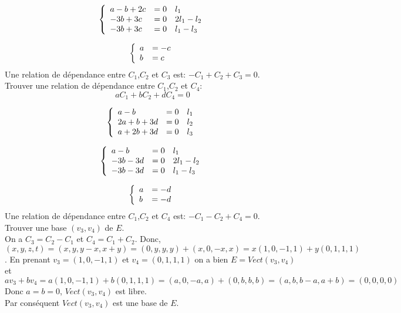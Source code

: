 \documentclass[]{book}
\theoremstyle{definition}
\begin{document}
$$
\left\{ 
\begin{array}{l l l}
a - b + 2c & = 0 & l_1 \\
    -3b + 3c & = 0 & 2l_1-l_2 \\
    -3b + 3c & = 0 & l_1 - l_3 \\
\end{array}
\right. 
$$

$$
\left\{ 
\begin{array}{l l}
a & = -c \\
b & = c \\
\end{array}
\right. 
$$
Une relation de d\'ependance entre $C_1$,$C_2$ et $C_3$ est: $-C_1 + C_2 + C_3 = 0$.\\


Trouver une relation de d\'ependance entre $C_1$,$C_2$ et $C_4$:\\
$$aC_1+bC_2+dC_4 = 0$$

$$
\left\{ 
\begin{array}{l l l}
a - b  & = 0 & l_1\\
2a + b + 3d & = 0 & l_2 \\
a +   2b + 3d & = 0 & l_3 \\
\end{array}
\right. 
$$

$$
\left\{ 
\begin{array}{l l l}
a - b  & = 0 & l_1\\
    -3b - 3d & = 0 & 2l_1 - l_2\\
    -3b - 3d & = 0 & l_1 - l_3\\
\end{array}
\right. 
$$

$$
\left\{ 
\begin{array}{l l}
a & = -d \\
b & = -d \\
\end{array}
\right. 
$$
Une relation de d\'ependance entre $C_1$,$C_2$ et $C_4$ est: $-C_1 - C_2 + C_4 = 0$.\\


Trouver une base $(v_3, v_4)$ de $E$.\\
On a $C_3=C_2-C_1$ et $C_4=C_1+C_2$. Donc, $(x,y,z,t) = (x,y,y-x,x+y) = (0,y,y,y) + (x,0,-x,x) = x(1,0,-1,1) + y(0,1,1,1)$. En prenant $v_3 = (1,0,-1,1)$ et $v_4 = (0,1,1,1)$ on a bien $E = Vect(v_3,v_4)$ et 
$$av_3 + bv_4 = a(1,0,-1,1) + b(0,1,1,1) = (a,0,-a,a)+(0,b,b,b) = (a,b,b-a,a+b) = (0,0,0,0)$$
Donc $a=b=0$, $Vect(v_3,v_4)$ est libre.\\
Par cons\'equent $Vect(v_3,v_4)$ est une base de $E$.\\
\end{document}
